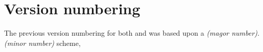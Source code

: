\chapter{Version numbering}
\label{chp:versionnumbering}

The previous version numbering for both \xitext{} and \xibatch{} was based upon a \textit{(magor number).(minor number)} scheme,

